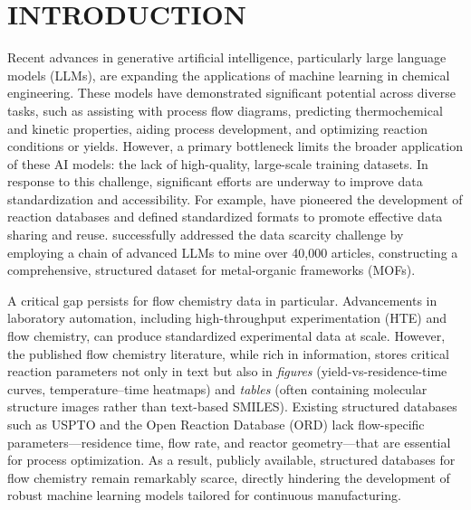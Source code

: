 \documentclass[journal=jcisd8,manuscript=article]{achemso}
\begin{document}
\section{INTRODUCTION}

Recent advances in generative artificial intelligence, particularly large language models (LLMs), are expanding the applications of machine learning in chemical engineering\cite{schweidtmann2024generative,D5CS00146C,D4SC03921A,boiko2023autonomous,doi:10.1021/acs.oprd.3c00229}.
These models have demonstrated significant potential across diverse tasks, such as assisting with process flow diagrams\cite{aicheasdas}, predicting thermochemical and kinetic properties\cite{tomme2025machine}, aiding process development\cite{ruan2024automatic}, and optimizing reaction conditions or yields\cite{doi:10.1021/acs.jcim.2c01085,doi:10.1021/acs.jcim.0c01234,schwaller2021prediction,D2SC06041H}.
However, a primary bottleneck limits the broader application of these AI models: the lack of high-quality, large-scale training datasets.\cite{tomme2025machine,gartner2024data,chen2024autotemplate}
In response to this challenge, significant efforts are underway to improve data standardization and accessibility.
For example, \citeauthor{doi:10.1021/jacs.1c09820} have pioneered the development of reaction databases and defined standardized formats to promote effective data sharing and reuse\cite{doi:10.1021/acs.jcim.3c00607}.
\citeauthor{jacs_mof} successfully addressed the data scarcity challenge by employing a chain of advanced LLMs to mine over 40,000 articles, constructing a comprehensive, structured dataset for metal-organic frameworks (MOFs)\cite{jacs_mof}.

A critical gap persists for flow chemistry data in particular.
Advancements in laboratory automation, including high-throughput experimentation (HTE)\cite{lu2024roboticized,li2023deep} and flow chemistry\cite{D5DD00129C,ashikari2025real,adamo2016demand}, can produce standardized experimental data at scale.
However, the published flow chemistry literature, while rich in information, stores critical reaction parameters not only in text but also in \textit{figures} (yield-vs-residence-time curves, temperature--time heatmaps) and \textit{tables} (often containing molecular structure images rather than text-based SMILES).
Existing structured databases such as USPTO and the Open Reaction Database (ORD)\cite{doi:10.1021/jacs.1c09820} lack flow-specific parameters---residence time, flow rate, and reactor geometry---that are essential for process optimization.\cite{Deadman_2025}
As a result, publicly available, structured databases for flow chemistry remain remarkably scarce, directly hindering the development of robust machine learning models tailored for continuous manufacturing.
\end{document}
